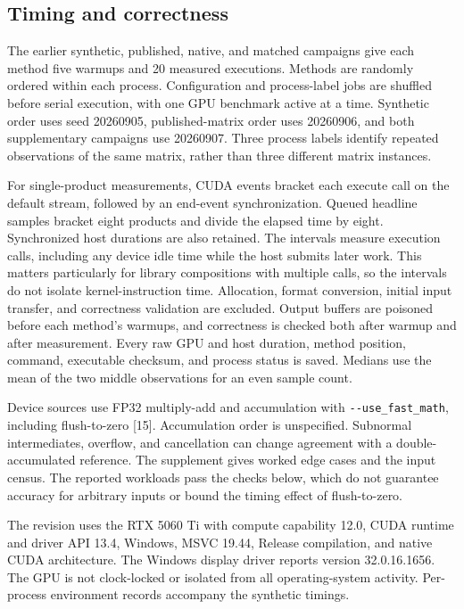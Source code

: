 \documentclass[10pt]{article}
\begin{document}
\subsection{Timing and correctness}
The earlier synthetic, published, native, and matched campaigns give each
method five warmups and 20 measured executions. Methods are
randomly ordered within each process. Configuration and process-label jobs
are shuffled before serial execution, with one GPU benchmark active at a
time. Synthetic order uses seed 20260905, published-matrix order uses 20260906,
and both supplementary campaigns use 20260907.
Three process labels identify repeated observations of the same matrix,
rather than three different matrix instances.

For single-product measurements, CUDA events bracket each execute call on
the default stream, followed by an end-event synchronization. Queued headline
samples bracket eight products and divide the elapsed time by eight. Synchronized host durations are also retained.
The intervals measure execution calls, including any device idle time while
the host submits later work. This matters particularly for library compositions
with multiple calls, so the intervals do not isolate kernel-instruction time.
Allocation, format conversion, initial input transfer, and correctness
validation are excluded. Output buffers are poisoned before each method's warmups, and correctness
is checked both after warmup and after measurement. Every raw GPU and host
duration, method position, command, executable checksum, and process status
is saved. Medians use the mean of the two middle
observations for an even sample count.

Device sources use FP32 multiply-add and accumulation with
\texttt{-{}-use\_fast\_math}, including flush-to-zero [15]. Accumulation order
is unspecified. Subnormal intermediates, overflow, and cancellation can
change agreement with a double-accumulated reference. The supplement gives
worked edge cases and the input census. The reported workloads pass the
checks below, which do not guarantee accuracy for arbitrary inputs or bound
the timing effect of flush-to-zero.

The revision uses the RTX 5060 Ti with compute capability 12.0, CUDA runtime
and driver API 13.4, Windows, MSVC 19.44, Release compilation, and native CUDA
architecture. The Windows display driver reports version
32.0.16.1656. The GPU is not clock-locked or isolated from all operating-system
activity. Per-process environment records accompany the synthetic timings.
\end{document}
